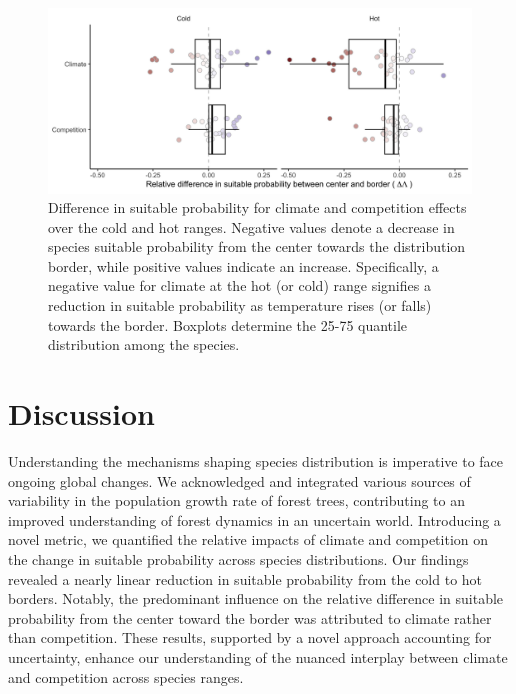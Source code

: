 \hypertarget{fig:diff_sp_hist}{%
\begin{figure}
\centering
\includegraphics[width=1\textwidth,height=\textheight]{manuscript/figs/fig-diff_sp_hist-1.png}
\caption[{Difference in suitable probability for climate and competition
effects over the cold and hot ranges.}]{Difference in suitable
probability for climate and competition effects over the cold and hot
ranges. Negative values denote a decrease in species suitable
probability from the center towards the distribution border, while
positive values indicate an increase. Specifically, a negative value for
climate at the hot (or cold) range signifies a reduction in suitable
probability as temperature rises (or falls) towards the border. Boxplots
determine the 25-75 quantile distribution among the species.}
\label{fig:diff_sp_hist}
\end{figure}
}

\hypertarget{discussion}{%
\section{Discussion}\label{discussion}}

Understanding the mechanisms shaping species distribution is imperative
to face ongoing global changes. We acknowledged and integrated various
sources of variability in the population growth rate of forest trees,
contributing to an improved understanding of forest dynamics in an
uncertain world. Introducing a novel metric, we quantified the relative
impacts of climate and competition on the change in suitable probability
across species distributions. Our findings revealed a nearly linear
reduction in suitable probability from the cold to hot borders. Notably,
the predominant influence on the relative difference in suitable
probability from the center toward the border was attributed to climate
rather than competition. These results, supported by a novel approach
accounting for uncertainty, enhance our understanding of the nuanced
interplay between climate and competition across species ranges.

